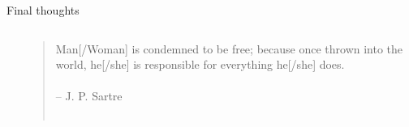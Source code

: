 \documentclass[serif]{beamer}\usepackage[]{graphicx}\usepackage[]{color}
\begin{document}
\begin{frame}{Final thoughts}{}
\begin{columns}
\begin{column}{0.5\textwidth}
\begin{center}
\centerline{}
\end{center}
\end{column}
\begin{column}{0.5\textwidth}
\begin{quote}
\normalsize
Man[/Woman] is condemned to be free; because once thrown into the world, he[/she] is responsible for everything he[/she] does.\\~\\
\vspace{0.05in}
\hfill -- J. P. Sartre\\~\\
\end{quote}
\end{column}
\end{columns}
\end{frame}
\end{document}

